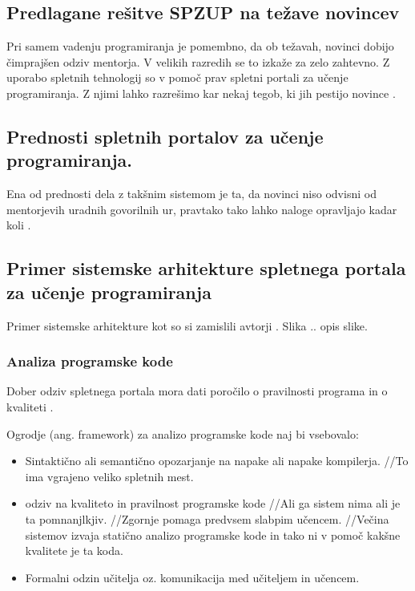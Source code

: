 \subsection{Predlagane rešitve SPZUP na težave novincev}
\label{predlagane_rešitve_na_težave_novincev}

Pri samem vadenju programiranja je pomembno, da ob težavah, novinci
dobijo čimprajšen odziv mentorja. V velikih razredih se to izkaže za
zelo zahtevno. Z uporabo spletnih tehnologij so v pomoč prav spletni
portali za učenje programiranja. Z njimi lahko razrešimo kar nekaj
tegob, ki jih pestijo novince \cite{thesisAWebP}.

\subsection{Prednosti spletnih portalov za učenje programiranja. }
\label{sec:prednosti_spzup}

Ena od prednosti dela z takšnim sistemom je ta, da novinci niso odvisni
od mentorjevih uradnih govorilnih ur, pravtako tako lahko naloge
opravljajo kadar koli \cite{thesisAWebP}.


\subsection{Primer sistemske arhitekture spletnega portala za učenje
  programiranja}
\label{sec:Primer_aritekture_spletnega_portala}

Primer sistemske arhitekture kot so si zamislili avtorji
\cite{ITaLCP_DistanceEdu}. Slika .. opis slike.


\subsubsection{Analiza programske kode}
\label{sec:analiza_programske_kode}


Dober odziv spletnega portala mora dati poročilo o pravilnosti programa in o
kvaliteti \cite{thesisAWebP}.

Ogrodje (ang. framework) za analizo programske kode naj bi vsebovalo:

\begin{itemize}
\item
  Sintaktično ali semantično opozarjanje na napake ali napake
  kompilerja. //To ima vgrajeno veliko spletnih mest.
\item
  odziv na kvaliteto in pravilnost programske kode //Ali ga sistem nima
  ali je ta pomnanjlkjiv. //Zgornje pomaga predvsem slabpim učencem.
  //Večina sistemov izvaja statično analizo programske kode in tako ni v
  pomoč kakšne kvalitete je ta koda.
\item
  Formalni odzin učitelja oz. komunikacija med učiteljem in učencem.
\end{itemize}

